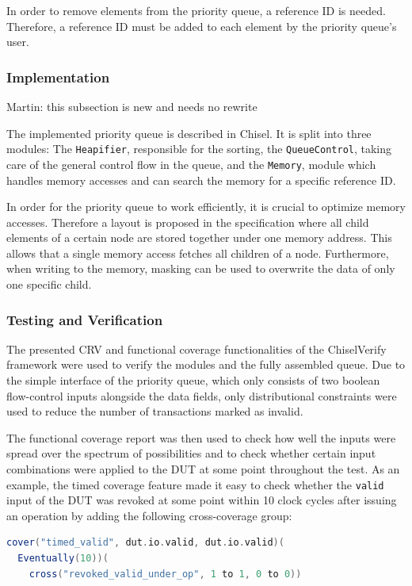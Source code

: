 \documentclass[conference]{IEEEtran}
\newcommand{\martin}[1]{{\color{blue} Martin: #1}}
\begin{document}
In order to remove elements from the priority queue, a reference ID is needed. 
Therefore, a reference ID must be added to each element by the priority queue's user.

\subsubsection{Implementation}
\martin{this subsection is new and needs no rewrite}

The implemented priority queue is described in Chisel.
It is split into three modules: The \texttt{Heapifier}, responsible for the sorting, the \texttt{QueueControl}, taking care
of the general control flow in the queue, and the \texttt{Memory}, module which handles memory accesses and can search the memory for a specific reference ID.

In order for the priority queue to work efficiently, it is crucial to optimize memory accesses. 
Therefore a layout is proposed in the specification where all child elements of a certain node are stored together under one memory address. 
This allows that a single memory access fetches all children of a node. Furthermore, when writing to the memory, masking can be used to overwrite the data of only one specific child.

\subsubsection{Testing and Verification}

The presented CRV and functional coverage functionalities of the ChiselVerify framework were used to verify the modules and the fully assembled queue.
Due to the simple interface of the priority queue, which only consists of two boolean flow-control inputs alongside the data fields, only distributional constraints were used to reduce the number of transactions marked as invalid. 

The functional coverage report was then used to check how well the inputs were spread over the spectrum of possibilities and to check whether certain input combinations were applied to the DUT at some point throughout the test. 
As an example, the timed coverage feature made it easy to check whether the \texttt{valid} input of the DUT was revoked at some point within 10 clock cycles after issuing an operation by adding the following cross-coverage group:

\begin{lstlisting}[language=scala, caption={A timed cover construct.}, label={lst:timedcover}]
cover("timed_valid", dut.io.valid, dut.io.valid)(
  Eventually(10))(
    cross("revoked_valid_under_op", 1 to 1, 0 to 0))
\end{lstlisting}
\end{document}
